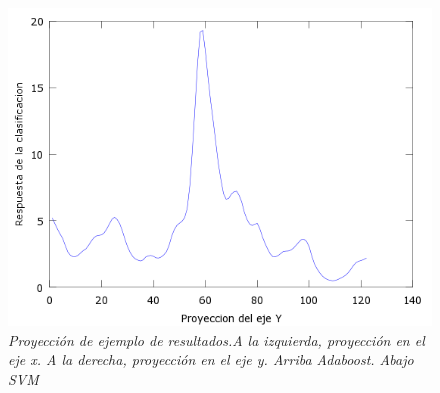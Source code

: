 \begin{figure}[htc]
  \includegraphics[scale=.4]{images/plots/svm6Y}
  \caption{\em  Proyección de ejemplo de resultados.A la izquierda, proyección en el eje x. A la derecha, proyección en el eje y. Arriba Adaboost. Abajo SVM}   
  \label{fig:pro6}
\end{figure}
